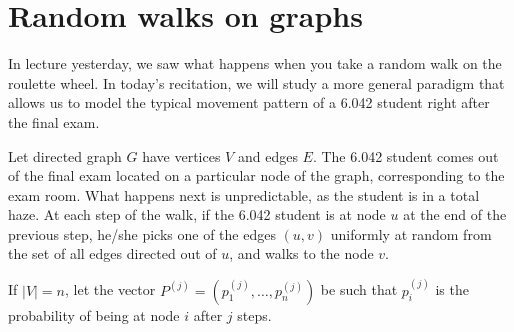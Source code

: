 \documentclass[12pt]{article}
\begin{document}


\section{Random walks on graphs}

In lecture yesterday, we saw what happens when you take a random walk
on the roulette wheel.  In today's recitation, we will study a more general
paradigm that allows us to model the typical movement pattern of a
6.042 student right after the final exam.

Let directed graph $G$ have vertices $V$ and edges $E$.
The 6.042 student comes out of the final exam located on a particular node
of the graph, corresponding to the exam room.  What happens next is unpredictable, as the
student is in a total haze.  At each step of the walk, if the 6.042 student 
is at node $u$ at the end of the previous step, he/she picks one of the edges $(u,v)$ 
uniformly at random from the set of all edges directed out of $u$, and
walks to the node $v$.

If $|V|=n$, let the vector $P^{(j)} = (p_1^{(j)},\ldots,p_n^{(j)})$
be such that $p_i^{(j)}$ is the probability of being at node
$i$ after $j$ steps.
\end{document}
